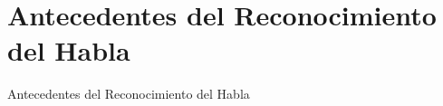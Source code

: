 \section{Antecedentes del Reconocimiento del Habla}
\begin{frame}{Antecedentes del Reconocimiento del Habla}
\end{frame}
